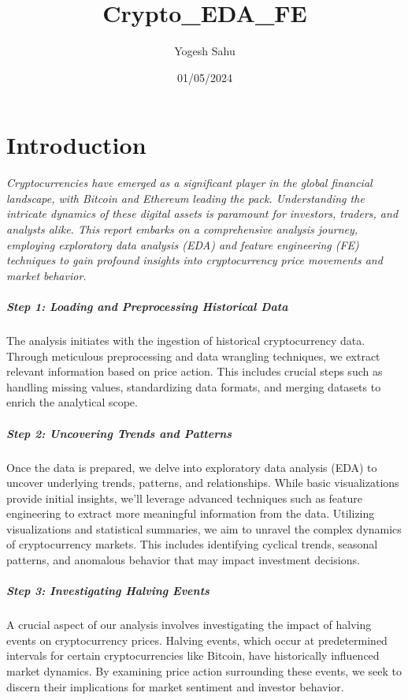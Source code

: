 \documentclass[
]{article}
\title{Crypto\_EDA\_FE}
\author{Yogesh Sahu}
\date{01/05/2024}
\begin{document}
\maketitle

\hypertarget{introduction}{%
\section{Introduction}\label{introduction}}

\emph{Cryptocurrencies have emerged as a significant player in the
global financial landscape, with Bitcoin and Ethereum leading the pack.
Understanding the intricate dynamics of these digital assets is
paramount for investors, traders, and analysts alike. This report
embarks on a comprehensive analysis journey, employing exploratory data
analysis (EDA) and feature engineering (FE) techniques to gain profound
insights into cryptocurrency price movements and market behavior.}

\hypertarget{step-1-loading-and-preprocessing-historical-data}{%
\subparagraph{Step 1: Loading and Preprocessing Historical
Data}\label{step-1-loading-and-preprocessing-historical-data}}

The analysis initiates with the ingestion of historical cryptocurrency
data. Through meticulous preprocessing and data wrangling techniques, we
extract relevant information based on price action. This includes
crucial steps such as handling missing values, standardizing data
formats, and merging datasets to enrich the analytical scope.

\hypertarget{step-2-uncovering-trends-and-patterns}{%
\subparagraph{Step 2: Uncovering Trends and
Patterns}\label{step-2-uncovering-trends-and-patterns}}

Once the data is prepared, we delve into exploratory data analysis (EDA)
to uncover underlying trends, patterns, and relationships. While basic
visualizations provide initial insights, we'll leverage advanced
techniques such as feature engineering to extract more meaningful
information from the data. Utilizing visualizations and statistical
summaries, we aim to unravel the complex dynamics of cryptocurrency
markets. This includes identifying cyclical trends, seasonal patterns,
and anomalous behavior that may impact investment decisions.

\hypertarget{step-3-investigating-halving-events}{%
\subparagraph{Step 3: Investigating Halving
Events}\label{step-3-investigating-halving-events}}

A crucial aspect of our analysis involves investigating the impact of
halving events on cryptocurrency prices. Halving events, which occur at
predetermined intervals for certain cryptocurrencies like Bitcoin, have
historically influenced market dynamics. By examining price action
surrounding these events, we seek to discern their implications for
market sentiment and investor behavior.
\end{document}
